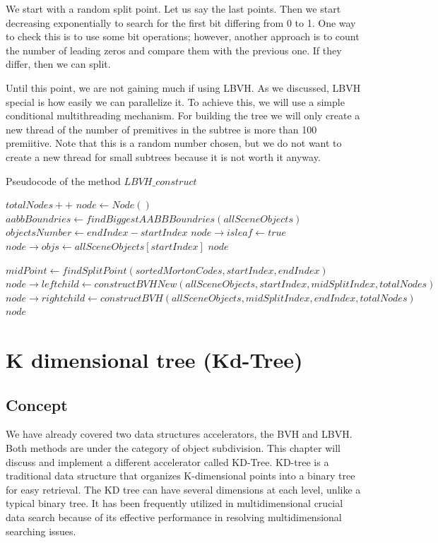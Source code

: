 \documentclass[11pt,a4paper]{article}
\begin{document}
We start with a random split point. Let us say the last points. Then we start decreasing exponentially to search for the first bit differing from 0 to 1. One way to check this is to use some bit operations; however, another approach is to count the number of leading zeros and compare them with the previous one. If they differ, then we can split. 
\\
\noindent

Until this point, we are not gaining much if using LBVH. As we discussed, LBVH special is how easily we can parallelize it. To achieve this, we will use a simple conditional multithreading mechanism. For building the tree we will only create a new thread of the number of premitives in the subtree is more than 100 premiitive. Note that this is a random number chosen, but we do not want to create a new thread for small subtrees because it is not worth it anyway.

\begin{algorithm}[H]
\caption{Pseudocode of the method $LBVH\_construct$}\label{alg:alg1}
\begin{algorithmic}
\State $totalNodes++$
\State $node \gets Node()$
\State $aabbBoundries \gets findBiggestAABBBoundries(allSceneObjects)$
\State $objectsNumber \gets  endIndex - startIndex$
	\State $node \rightarrow isleaf \gets true$
	\State $node \rightarrow objs \gets allSceneObjects[startIndex]$
	\State \Return $node$
\EndIf

\State $midPoint \gets findSplitPoint(sortedMortonCodes, startIndex, endIndex)$
\State $node \rightarrow leftchild  \gets constructBVHNew(allSceneObjects, startIndex, midSplitIndex, totalNodes)$
\State $node \rightarrow rightchild  \gets constructBVH(allSceneObjects, midSplitIndex, endIndex, totalNodes)$
\State \Return $node$
\EndFunction
\end{algorithmic}
\end{algorithm}
\clearpage



\section{K dimensional tree (Kd-Tree)}
\subsection{Concept}
We have already covered two data structures accelerators, the BVH and LBVH. Both methods are under the category of object subdivision. This chapter will discuss and implement a different accelerator called KD-Tree.
KD-tree is a traditional data structure that organizes K-dimensional points into a binary tree for easy retrieval. The KD tree can have several dimensions at each level, unlike a typical binary tree. It has been frequently utilized in multidimensional crucial data search because of its effective performance in resolving multidimensional searching issues.
\\
\noindent
\end{document}
